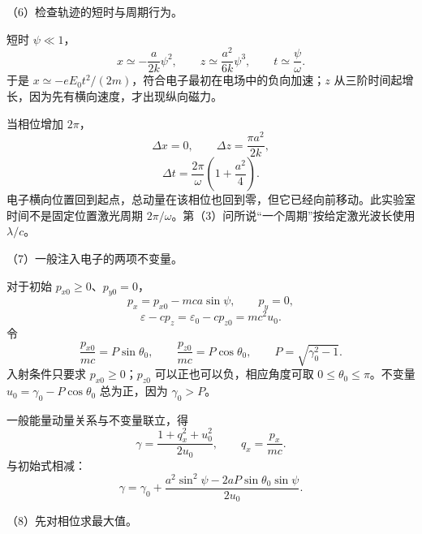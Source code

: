 \documentclass[12pt,a4paper,fontset=fandol]{ctexart}
\begin{document}
\begin{center}
\begin{minipage}{\linewidth}
\centering\begingroup
{}
\ifdim\wd\diagrambox>.88\linewidth
\sbox{\diagrambox}{\resizebox{.88\linewidth}{!}{\usebox{\diagrambox}}}
\fi
\ifdim\ht\diagrambox>.40\textheight
\resizebox{!}{.40\textheight}{\usebox{\diagrambox}}
\else\usebox{\diagrambox}\fi
\par{}
\endgroup\end{minipage}
\end{center}

（6）检查轨迹的短时与周期行为。

短时 \(\psi\ll1\)， \[
x\simeq-\frac{a}{2k}\psi^2,\qquad
z\simeq\frac{a^2}{6k}\psi^3,\qquad
t\simeq\frac{\psi}{\omega}.
\] 于是 \(x\simeq-eE_0t^2/(2m)\)，符合电子最初在电场中的负向加速；\(z\)
从三阶时间起增长，因为先有横向速度，才出现纵向磁力。

当相位增加 \(2\pi\)， \[
\Delta x=0,\qquad
\Delta z=\frac{\pi a^2}{2k},
\] \[
\Delta t=\frac{2\pi}{\omega}
\left(1+\frac{a^2}{4}\right).
\]
电子横向位置回到起点，总动量在该相位也回到零，但它已经向前移动。此实验室时间不是固定位置激光周期
\(2\pi/\omega\)。第（3）问所说``一个周期''按给定激光波长使用
\(\lambda/c\)。

（7）一般注入电子的两项不变量。

对于初始 \(p_{x0}\ge0\)、\(p_{y0}=0\)， \[
p_x=p_{x0}-mca\sin\psi,\qquad p_y=0,
\] \[
\varepsilon-cp_z=\varepsilon_0-cp_{z0}=mc^2u_0.
\] 令 \[
\frac{p_{x0}}{mc}=P\sin\theta_0,\qquad
\frac{p_{z0}}{mc}=P\cos\theta_0,\qquad
P=\sqrt{\gamma_0^2-1}.
\] 入射条件只要求 \(p_{x0}\ge0\)；\(p_{z0}\)
可以正也可以负，相应角度可取 \(0\le\theta_0\le\pi\)。不变量
\(u_0=\gamma_0-P\cos\theta_0\) 总为正，因为 \(\gamma_0>P\)。

一般能量动量关系与不变量联立，得 \[
\gamma=\frac{1+q_x^2+u_0^2}{2u_0},
\qquad q_x=\frac{p_x}{mc}.
\] 与初始式相减： \[
\boxed{\gamma=\gamma_0+
\frac{a^2\sin^2\psi-2aP\sin\theta_0\sin\psi}{2u_0}.}\tag{4.9}
\]

（8）先对相位求最大值。
\end{document}
